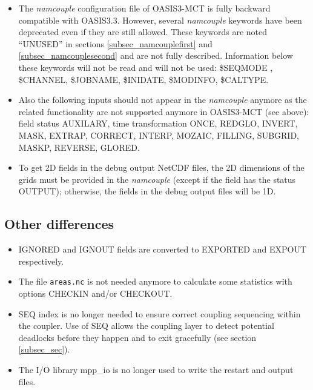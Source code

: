 \begin{itemize}

\item The {\it namcouple} configuration file of OASIS3-MCT is fully backward
compatible with OASIS3.3. However, several {\it namcouple} keywords
have been deprecated even if they are still
allowed.  These keywords are noted ``UNUSED'' in sections
\ref{subsec_namcouplefirst} and \ref{subsec_namcouplesecond} and are
not fully described. Information below these keywords will not be read
and will not be used: \$SEQMODE , \$CHANNEL, \$JOBNAME, \$INIDATE,
\$MODINFO, \$CALTYPE.

\item Also the following inputs should not appear in the {\it namcouple}
anymore as the related functionality are not supported anymore in
OASIS3-MCT (see above): field status AUXILARY, time transformation
ONCE, REDGLO, INVERT, MASK, EXTRAP, CORRECT, INTERP, MOZAIC, FILLING,
SUBGRID, MASKP, REVERSE, GLORED.

\item To get 2D fields in the debug output NetCDF files, the 2D dimensions of the
  grids must be provided in the {\it namcouple} (except if the field
  has the status OUTPUT); otherwise, the fields in the debug output files will be 1D.

\end{itemize}

\subsection{Other differences}
\label{sec_changes_other}

\begin{itemize}

\item IGNORED and IGNOUT fields are converted to EXPORTED and EXPOUT
  respectively.

\item The file {\tt areas.nc} is not needed anymore to calculate some
  statistics with options CHECKIN and/or CHECKOUT.

\item SEQ index is no longer needed to ensure correct coupling
  sequencing within the coupler. Use of SEQ allows the coupling layer
  to detect potential deadlocks before they happen and to exit
  gracefully (see section \ref{subsec_sec}).

\item The I/O library mpp\_io is no longer used to write the restart and output files.


\end{itemize}
